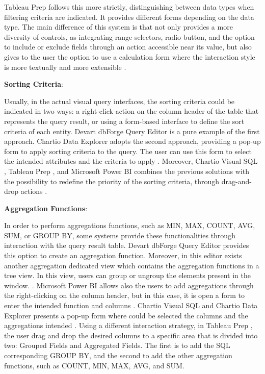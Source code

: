 Tableau Prep \cite{tableauPrep} follows this more strictly, distinguishing between data types when filtering criteria are indicated. It provides different forms depending on the data type. The main difference of this system is that not only provides a more diversity of controls, as integrating range selectors, radio button, and the option to include or exclude fields through an action accessible near its value, but also gives to the user the option to use a calculation form where the interaction style is more textually and more extensible \cite{tableauFilterYourData}.

\textbf{Sorting Criteria}: 

Usually, in the actual visual query interfaces, the sorting criteria could be indicated in two ways: a right-click action on the column header of the table that represents the query result, or using a form-based interface to define the sort criteria of each entity. Devart dbForge Query Editor \cite{dbForgeQueryBuilder} is a pure example of the first approach. \cite{dbForgeSortingData} Chartio Data Explorer \cite{chartioDataExplorer} adopts the second approach, providing a pop-up form to apply sorting criteria to the query. The user can use this form to select the intended attributes and the criteria to apply \cite{chartioAdvancedSorting}. Moreover, Chartio Visual SQL \cite{chartioVisualSQL}, Tableau Prep \cite{tableauPrep}, and Microsoft Power BI \cite{powerBI} combines the previous solutions with the possibility to redefine the priority of the sorting criteria, through drag-and-drop actions \cite{visualSqlActions,tableauSortData,powerBIShapeAndCombineData}.

\textbf{Aggregation Functions}: 

In order to perform aggregations functions, such as MIN, MAX, COUNT, AVG, SUM, or GROUP BY, some systems provide these functionalities through interaction with the query result table. Devart dbForge Query Editor \cite{dbForgeQueryBuilder} provides this option to create an aggregation function. Moreover, in this editor exists another aggregation dedicated view which contains the aggregation functions in a tree view. In this view, users can group or ungroup the elements present in the window. \cite{dbForgeGroupingDataInGrid}. Microsoft Power BI \cite{powerBI} allows also the users to add aggregations through the right-clicking on the column header, but in this case, it is open a form to enter the intended function and columns \cite{powerBICommonQueryTasks}. Chartio Visual SQL \cite{chartioVisualSQL} and Chartio Data Explorer \cite{chartioDataExplorer} presents a pop-up form where could be selected the columns and the aggregations intended \cite{chartioDataPipelineSteps}. Using a different interaction strategy, in Tableau Prep \cite{tableauPrep}, the user drag and drop the desired columns to a specific area that is divided into two: Grouped Fields and Aggregated Fields. The first is to add the SQL corresponding GROUP BY, and the second to add the other aggregation functions, such as COUNT, MIN, MAX, AVG, and SUM.

